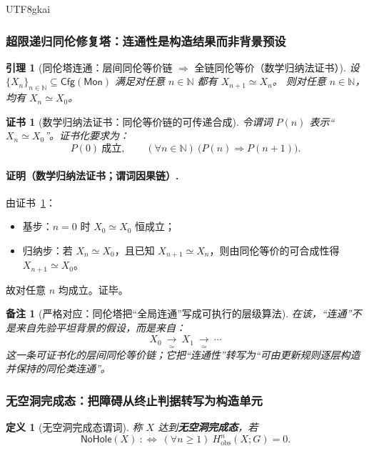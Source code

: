 \documentclass[12pt]{article}
\newtheorem{definition}{定义}[section]
\newtheorem{lemma}{引理}[section]
\newtheorem{remark}{备注}[section]
\newtheorem{Certificate}{证书}[section]
\newcommand{\NN}{\mathbb{N}}
\newcommand{\KouJing}{\texorpdfstring{表述约定}{表述约定}}
\begin{document}
\begin{CJK*}{UTF8}{gkai}
\subsubsection{超限递归同伦修复塔：连通性是构造结果而非背景预设}
\label{subsubsec:tex29-ch14-new-tower}

\begin{lemma}[同伦塔连通：层间同伦等价链 $\Rightarrow$ 全链同伦等价（数学归纳法证书）]
\label{lem:tex29-ch14-tower-connected}
设 $\{X_n\}_{n\in\NN}\subseteq\mathsf{Cfg}(\mathsf{Mon})$ 满足对任意 $n\in\NN$ 都有 $X_{n+1}\simeq X_n$。
则对任意 $n\in\NN$，均有 $X_n\simeq X_0$。
\end{lemma}

\begin{Certificate}[数学归纳法证书：同伦等价链的可传递合成]
\label{cert:tex29-ch14-tower-connected}
令谓词 $P(n)$ 表示“$X_n\simeq X_0$”。证书化要求为：
\[
  P(0)\ \text{成立},\qquad (\forall n\in\NN)\ \bigl(P(n)\Rightarrow P(n+1)\bigr).
\]
\end{Certificate}

\paragraph{证明（数学归纳法证书；谓词因果链）.}
由证书~\ref{cert:tex29-ch14-tower-connected}：
\begin{itemize}
  \item 基步：$n=0$ 时 $X_0\simeq X_0$ 恒成立；
  \item 归纳步：若 $X_n\simeq X_0$，且已知 $X_{n+1}\simeq X_n$，则由同伦等价的可合成性得 $X_{n+1}\simeq X_0$。
\end{itemize}
故对任意 $n$ 均成立。证毕。

\begin{remark}[严格对应：同伦塔把“全局连通”写成可执行的层级算法]
在该，“连通”不是来自先验平坦背景的假设，而是来自：
\[
  X_0\ \xrightarrow[\simeq]{}\ X_1\ \xrightarrow[\simeq]{}\ \cdots
\]
这一条可证书化的层间同伦等价链；它把“连通性”转写为“可由更新规则逐层构造并保持的同伦类连通”。
\end{remark}

\subsubsection{无空洞完成态：把障碍从终止判据转写为构造单元}
\label{subsubsec:tex29-ch14-new-nohole}

\begin{definition}[无空洞完成态谓词]
称 $X$ 达到\textbf{无空洞完成态}，若
\[
  \mathsf{NoHole}(X)\ :\Longleftrightarrow\ (\forall n\ge 1)\ H^n_{\mathrm{obs}}(X;G)=0.
\]
\end{definition}


\end{CJK*}
\end{document}
